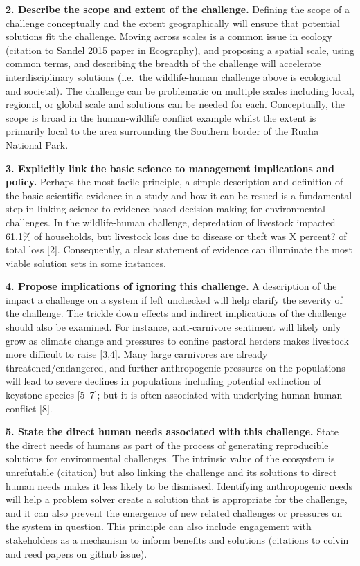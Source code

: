 \documentclass[10pt,letterpaper]{article}
\begin{document}
\textbf{2. Describe the scope and extent of the challenge.} Defining the
scope of a challenge conceptually and the extent geographically will
ensure that potential solutions fit the challenge. Moving across scales
is a common issue in ecology (citation to Sandel 2015 paper in
Ecography), and proposing a spatial scale, using common terms, and
describing the breadth of the challenge will accelerate
interdisciplinary solutions (i.e.~the wildlife-human challenge above is
ecological and societal). The challenge can be problematic on multiple
scales including local, regional, or global scale and solutions can be
needed for each. Conceptually, the scope is broad in the human-wildlife
conflict example whilst the extent is primarily local to the area
surrounding the Southern border of the Ruaha National Park.

\textbf{3. Explicitly link the basic science to management implications
and policy.} Perhaps the most facile principle, a simple description and
definition of the basic scientific evidence in a study and how it can be
resued is a fundamental step in linking science to evidence-based
decision making for environmental challenges. In the wildlife-human
challenge, depredation of livestock impacted 61.1\% of households, but
livestock loss due to disease or theft was X percent? of total loss
{[}2{]}. Consequently, a clear statement of evidence can illuminate the
most viable solution sets in some instances.

\textbf{4. Propose implications of ignoring this challenge.} A
description of the impact a challenge on a system if left unchecked will
help clarify the severity of the challenge. The trickle down effects and
indirect implications of the challenge should also be examined. For
instance, anti-carnivore sentiment will likely only grow as climate
change and pressures to confine pastoral herders makes livestock more
difficult to raise {[}3,4{]}. Many large carnivores are already
threatened/endangered, and further anthropogenic pressures on the
populations will lead to severe declines in populations including
potential extinction of keystone species {[}5--7{]}; but it is often
associated with underlying human-human conflict {[}8{]}.

\textbf{5. State the direct human needs associated with this challenge.}
State the direct needs of humans as part of the process of generating
reproducible solutions for environmental challenges. The intrinsic value
of the ecosystem is unrefutable (citation) but also linking the
challenge and its solutions to direct human needs makes it less likely
to be dismissed. Identifying anthropogenic needs will help a problem
solver create a solution that is appropriate for the challenge, and it
can also prevent the emergence of new related challenges or pressures on
the system in question. This principle can also include engagement with
stakeholders as a mechanism to inform benefits and solutions (citations
to colvin and reed papers on github issue).
\end{document}
